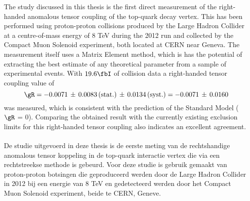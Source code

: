 The study discussed in this thesis is the first direct measurement of the right-handed anomalous tensor coupling of the top-quark decay vertex.
This has been performed using proton-proton collisions produced by the Large Hadron Collider at a centre-of-mass energy of 8 TeV during the 2012 run and collected by the Compact Muon Solenoid experiment, both located at CERN near Geneva.
The measurement itself uses a Matrix Element method, which is has the potential of extracting the best estimate of any theoretical parameter from a sample of experimental events.
With $19.6 \fbI$ of collision data a right-handed tensor coupling value of
\begin{equation}
 \gR = -0.0071 \, \pm \, 0.0083 \, (\textrm{stat.}) \, \pm \, 0.0134  \, (\textrm{syst.}) = -0.0071 \, \pm \, 0.0160 \nonumber
\end{equation}
was measured, which is consistent with the prediction of the Standard Model ($\gR$ = 0).
Comparing the obtained result with the currently existing exclusion limits for this right-handed tensor coupling also indicates an excellent agreement.
\\
\\
De studie uitgevoerd in deze thesis is de eerste meting van de rechtshandige anomalous tensor koppeling in de top-quark interactie vertex die via een rechtstreekse methode is gebeurd.
Voor deze studie is gebruik gemaakt van proton-proton botsingen die geproduceerd werden door de Large Hadron Collider in 2012 bij een energie van 8 TeV en gedetecteerd werden door het Compact Muon Solenoid experiment, beide te CERN, Geneve.
